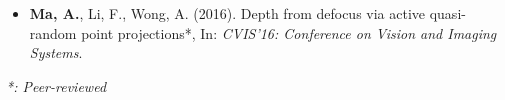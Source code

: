 \begin{adjustwidth}{\indentleft}{\indentright}
\begin{itemize}
            \item \textbf{Ma, A.}, Li, F., Wong, A. (2016). Depth from defocus via active quasi-random point projections*, In: \emph{CVIS'16: Conference on Vision and Imaging Systems}.
       
        \end{itemize}
        \hfill
        \textit{*: Peer-reviewed}
        
        
 
        
    \end{adjustwidth}
